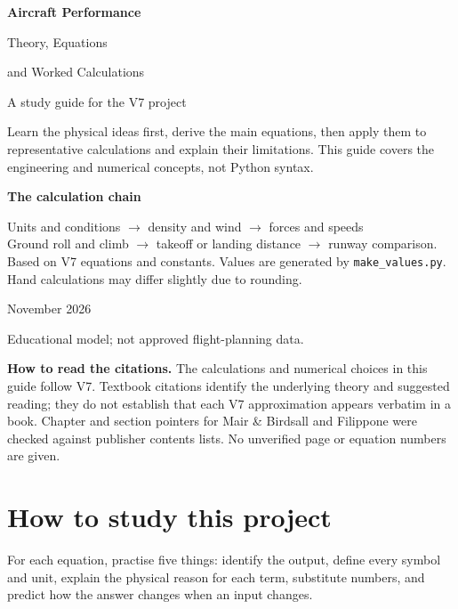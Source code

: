 \documentclass[11pt,letterpaper]{article}
\newcommand{\topic}[1]{\clearpage\section{#1}}
\begin{document}
\begin{titlepage}
\vspace{0.35in}
{\color{navy}\Huge\bfseries Aircraft Performance\par}
\vspace{0.2in}
{\LARGE Theory, Equations\par and Worked Calculations\par}
\vspace{0.35in}
{\large A study guide for the V7 project}\par
\vspace{0.45in}
\begin{keyidea}
Learn the physical ideas first, derive the main equations, then apply them
to representative calculations and explain their limitations.
This guide covers the engineering and numerical concepts, not Python syntax.
\end{keyidea}
\vspace{0.25in}
\textbf{The calculation chain}\par
Units and conditions $\rightarrow$ density and wind $\rightarrow$ forces and speeds\\[4pt]
Ground roll and climb $\rightarrow$ takeoff or landing distance $\rightarrow$ runway comparison.
\vfill
Based on V7 equations and constants. Values are generated by
\texttt{make\_values.py}. Hand calculations may differ slightly due to rounding.\par
November 2026\par
\small Educational model; not approved flight-planning data.
\end{titlepage}
\setlength{\cftbeforesecskip}{4pt}
\renewcommand{\cftsecfont}{\small}
\renewcommand{\cftsecpagefont}{\small}
\tableofcontents
\vfill
\begin{keyidea}
\textbf{How to read the citations.} The calculations and numerical choices in this
guide follow V7. Textbook citations identify the underlying theory and suggested
reading; they do not establish that each V7 approximation appears verbatim in a
book. Chapter and section pointers for Mair \& Birdsall and Filippone were checked
against publisher contents lists. No unverified page or equation numbers are given.
\end{keyidea}
\topic{How to study this project}
For each equation, practise five things: identify the output, define every
symbol and unit, explain the physical reason for each term, substitute numbers,
and predict how the answer changes when an input changes.
\end{document}
